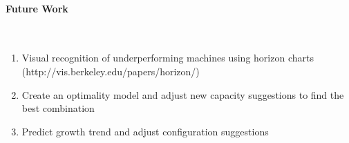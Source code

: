\documentclass[]{final_report}
\newcommand{\myparagraph}[1]{\paragraph{#1}\mbox{}\\}
\begin{document}
\myparagraph{Future Work}
\begin{enumerate}
\item Visual recognition of underperforming machines using horizon charts (http://vis.berkeley.edu/papers/horizon/)
\item Create an optimality model and adjust new capacity suggestions to find the best combination
\item Predict growth trend and adjust configuration suggestions



\end{enumerate}


\newpage

\label{endpage}
{}

\end{document}

